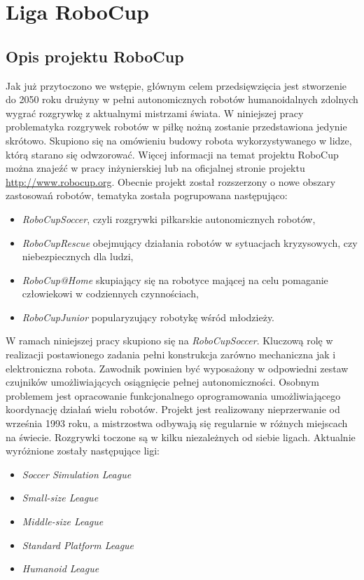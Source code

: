 \chapter{Liga RoboCup \label{chap:robocup}}
\section{Opis projektu RoboCup \label{sec:opis_robocup}}
	Jak już przytoczono we wstępie, głównym celem przedsięwzięcia jest stworzenie do 2050 roku drużyny w pełni autonomicznych robotów humanoidalnych zdolnych wygrać rozgrywkę z aktualnymi mistrzami 
	świata.
	W niniejszej pracy problematyka rozgrywek robotów w piłkę nożną zostanie przedstawiona jedynie skrótowo. Skupiono się na omówieniu
	budowy robota wykorzystywanego w lidze, którą starano się odwzorować. Więcej informacji na temat projektu RoboCup można znajeźć w pracy inżynierskiej \cite{inzynierka} lub 
	na oficjalnej stronie projektu \mbox{\url{http://www.robocup.org}}.
	 Obecnie projekt został rozszerzony o nowe obszary zastosowań robotów, tematyka została pogrupowana następująco:
	\begin{itemize}
	      \item \emph{RoboCupSoccer}, czyli rozgrywki piłkarskie autonomicznych robotów,
	      \item \emph{RoboCupRescue} obejmujący działania robotów w sytuacjach kryzysowych, czy niebezpiecznych dla ludzi,
	      \item \emph{RoboCup@Home} skupiający się na robotyce mającej na celu pomaganie człowiekowi w codziennych czynnościach,
	      \item \emph{RoboCupJunior} popularyzujący robotykę wśród młodzieży.
	\end{itemize}

	W ramach niniejszej pracy skupiono się na \emph{RoboCupSoccer}.
	Kluczową rolę w realizacji postawionego zadania pełni konstrukcja zarówno mechaniczna jak i elektroniczna
	robota. Zawodnik powinien być wyposażony w odpowiedni zestaw czujników umożliwiających osiągnięcie pełnej autonomiczności. 
	Osobnym problemem jest opracowanie funkcjonalnego oprogramowania umożliwiającego koordynację działań wielu robotów.
	Projekt jest realizowany nieprzerwanie od września 1993 roku, a mistrzostwa odbywają się regularnie w różnych miejscach na świecie.
	Rozgrywki toczone są w kilku niezależnych od siebie ligach. Aktualnie wyróżnione zostały następujące ligi:
	\begin{itemize}
	\item \emph{Soccer Simulation League}
	\item \emph{Small-size League}
	\item \emph{Middle-size League}
	\item \emph{Standard Platform League }
	\item \emph{Humanoid League}
	\end{itemize}
	
